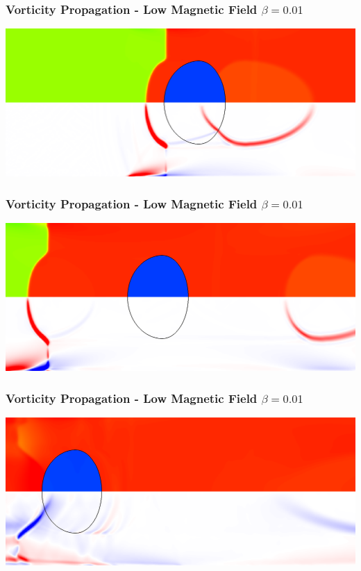 \documentclass{beamer}
\begin{document}
\begin{frame}
\frametitle{Vorticity Propagation - Low Magnetic Field $\beta = 0.01$}
\includegraphics[width=\textwidth]{../images/SRMHDBubbleBeta001_t31_crop.png}
\end{frame}

\begin{frame}
\frametitle{Vorticity Propagation - Low Magnetic Field $\beta = 0.01$}
\includegraphics[width=\textwidth]{../images/SRMHDBubbleBeta001_t59_crop.png}
\end{frame}

\begin{frame}
\frametitle{Vorticity Propagation - Low Magnetic Field $\beta = 0.01$}
\includegraphics[width=\textwidth]{../images/SRMHDBubbleBeta001_t125_crop.png}
\end{frame}
\end{document}
